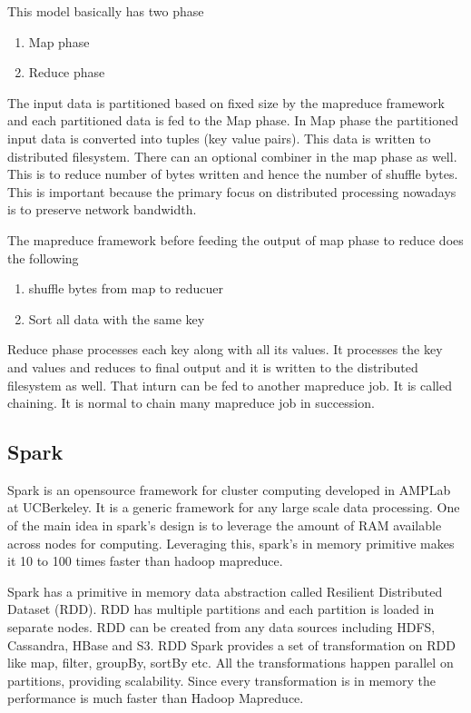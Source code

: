 \documentclass[conference]{IEEEtran}
\begin{document}
This model basically has two phase
\begin{enumerate}
\item Map phase
\item Reduce phase
\end{enumerate}

The input data is partitioned based on fixed size by the mapreduce
framework and each partitioned
data is fed to the Map phase. In Map phase the partitioned input data
is converted into tuples (key value
pairs). This data is written to distributed filesystem.
There can an optional combiner in the map phase as well. This
is to reduce number of bytes written and hence the number of shuffle
bytes. This is important because the
primary focus on distributed processing nowadays is to preserve
network bandwidth.

\medskip

The mapreduce framework before feeding the output of map phase to
reduce does the following
\begin{enumerate}
\item shuffle bytes from map to reducuer
\item Sort all data with the same key
\end{enumerate}

Reduce phase processes each key along with all its values. It
processes the key and values and reduces to final
output and it is written to the distributed filesystem as well.
That inturn can be fed to another mapreduce job. It is called
chaining. It is normal to chain many mapreduce job in succession.

\bigskip

\subsection{Spark}
Spark is an opensource framework for cluster computing developed in
AMPLab at UCBerkeley. It is a generic framework for any large scale
data processing. One of the main idea in spark's design is to leverage
the amount of RAM available across nodes for computing. Leveraging this, spark's in memory primitive
makes it 10 to 100 times faster than hadoop mapreduce.

\medskip

Spark has a primitive in memory data abstraction called Resilient Distributed
Dataset (RDD). RDD has multiple partitions and each partition is
loaded in separate nodes. RDD can be created from any data sources including
HDFS, Cassandra, HBase and S3. RDD Spark provides a set of transformation on
RDD like map, filter, groupBy, sortBy etc. All the transformations
happen parallel on partitions, providing scalability. Since every transformation
is in memory the performance is much faster than Hadoop Mapreduce.
\end{document}
